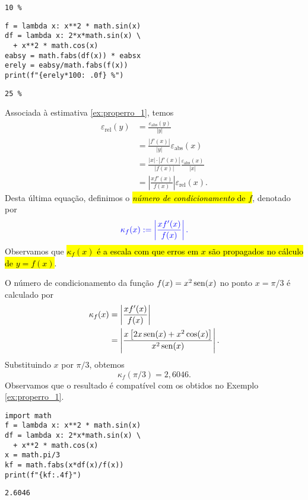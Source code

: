 \begin{ex}
\begin{verbatim}
10 %
\end{verbatim}

\begin{lstlisting}
f = lambda x: x**2 * math.sin(x) 
df = lambda x: 2*x*math.sin(x) \
  + x**2 * math.cos(x)
eabsy = math.fabs(df(x)) * eabsx
erely = eabsy/math.fabs(f(x))
print(f"{erely*100: .0f} %")
\end{lstlisting}

\begin{verbatim}
25 %
\end{verbatim}
  
\end{ex}

Associada à estimativa \eqref{ex:properro_1}, temos
\begin{align*}
  \varepsilon_{\text{rel}}(y) &= \frac{\varepsilon_{\text{abs}}(y)}{|y|}\\
  &= \frac{|f'(x)|}{|y|}\varepsilon_{\text{abs}}(x)\\
  &= \frac{|x|\cdot |f'(x)|}{|f(x)|}\frac{\varepsilon_{\text{abs}}(x)}{|x|}\\
  &= \left|\frac{xf'(x)}{f(x)}\right|\varepsilon_{\text{rel}}(x).
\end{align*}
Desta última equação, definimos o \hl{\emph{número de condicionamento} de $f$}, denotado por
\begin{equation}
  \color{blue}\kappa_f(x) := \left|\frac{xf'(x)}{f(x)}\right|.
\end{equation}
Observamos que \hl{$\kappa_f(x)$ é a escala com que erros em $x$ são propagados no cálculo de $y = f(x)$}.

\begin{ex}\label{ex:numcond_1}
  O número de condicionamento da função $f(x) = x^2\operatorname{sen}(x)$ no ponto $x=\pi/3$ é calculado por
  \begin{align}
    \kappa_f(x) &= \left|\frac{xf'(x)}{f(x)}\right|\\
                &= \left|\frac{x\left[2x\operatorname{sen}(x)+x^2\cos(x)\right]}{x^2\operatorname{sen}(x)}\right|. 
  \end{align}
  Substituindo $x$ por $\pi/3$, obtemos
  \begin{equation}
    \kappa_f(\pi/3) = 2,6046.
  \end{equation}
  Observamos que o resultado é compatível com os obtidos no Exemplo \ref{ex:properro_1}.
  
  
\begin{lstlisting}
import math
f = lambda x: x**2 * math.sin(x) 
df = lambda x: 2*x*math.sin(x) \
  + x**2 * math.cos(x)
x = math.pi/3
kf = math.fabs(x*df(x)/f(x))
print(f"{kf:.4f}")
\end{lstlisting}

\begin{verbatim}
2.6046
\end{verbatim}
  
\end{ex}

